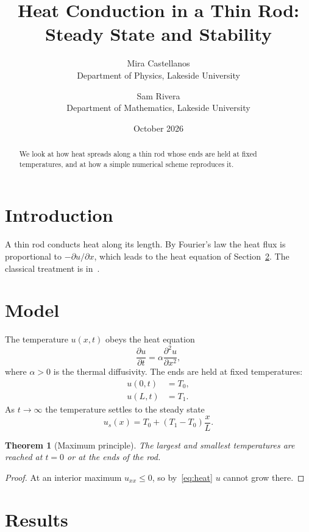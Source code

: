 \documentclass[11pt,a4paper]{article}
\title{Heat Conduction in a Thin Rod: Steady State and Stability}
\author{Mira Castellanos\\ \small Department of Physics, Lakeside University \and Sam Rivera\\ \small Department of Mathematics, Lakeside University}
\date{October 2026}
\newtheorem{theorem}{Theorem}
\begin{document}
\maketitle

\begin{abstract}
We look at how heat spreads along a thin rod whose ends are held at fixed temperatures, and at how a simple numerical scheme reproduces it.
\end{abstract}

\section{Introduction}\label{sec:intro}

A thin rod conducts heat along its length. By Fourier's law the heat flux is proportional to $-\partial u/\partial x$, which leads to the heat equation of Section~\ref{sec:model}. The classical treatment is in~\cite{carslaw1959}.

\section{Model}\label{sec:model}

The temperature $u(x,t)$ obeys the heat equation
\begin{equation}
  \frac{\partial u}{\partial t}=\alpha\frac{\partial^{2}u}{\partial x^{2}},
  \label{eq:heat}
\end{equation}
where $\alpha>0$ is the thermal diffusivity. The ends are held at fixed temperatures:
\begin{align}
  u(0,t) &=T_{0}, \label{eq:bc0} \\
  u(L,t) &=T_{1}. \label{eq:bc1}
\end{align}
As $t\to\infty$ the temperature settles to the steady state
\begin{equation}
  u_{s}(x)=T_{0}+(T_{1}-T_{0})\frac{x}{L}.
  \label{eq:steady}
\end{equation}

\begin{theorem}[{Maximum principle}]\label{thm:max}
  The largest and smallest temperatures are reached at $t=0$ or at the ends of the rod.
\end{theorem}

\begin{proof}
  At an interior maximum $u_{xx}\leq0$, so by~\eqref{eq:heat} $u$ cannot grow there.
\end{proof}

\section{Results}\label{sec:results}
\end{document}
